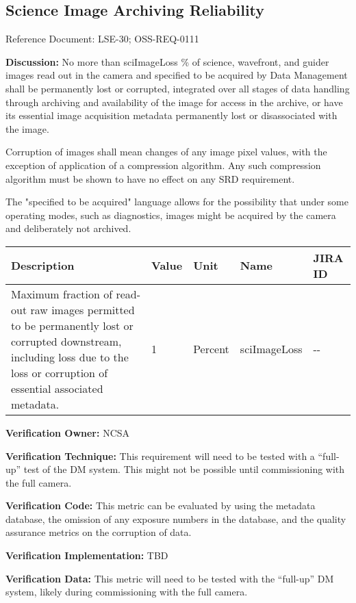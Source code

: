 \subsection{Science Image Archiving
Reliability}\label{science-image-archiving-reliability}

Reference Document: LSE-30; OSS-REQ-0111

\textbf{Discussion:} No more than sciImageLoss \% of science, wavefront,
and guider images read out in the camera and specified to be acquired by
Data Management shall be permanently lost or corrupted, integrated over
all stages of data handling through archiving and availability of the
image for access in the archive, or have its essential image acquisition
metadata permanently lost or disassociated with the image.

Corruption of images shall mean changes of any image pixel values, with
the exception of application of a compression algorithm. Any such
compression algorithm must be shown to have no effect on any SRD
requirement.

The "specified to be acquired" language allows for the possibility that
under some operating modes, such as diagnostics, images might be
acquired by the camera and deliberately not archived.

\begin{longtable}[]{@{}lllll@{}}
\toprule
Description & Value & Unit & Name & JIRA ID\tabularnewline
\midrule
\endhead
Maximum fraction of read-out raw images permitted to be permanently lost
or corrupted downstream, including loss due to the loss or corruption of
essential associated metadata. & 1 & Percent & sciImageLoss &
-\/-\tabularnewline
\bottomrule
\end{longtable}

\textbf{Verification Owner:} NCSA

\textbf{Verification Technique:} This requirement will need to be tested
with a ``full-up'' test of the DM system. This might not be possible
until commissioning with the full camera.

\textbf{Verification Code:} This metric can be evaluated by using the
metadata database, the omission of any exposure numbers in the database,
and the quality assurance metrics on the corruption of data.

\textbf{Verification Implementation:} TBD

\textbf{Verification Data:} This metric will need to be tested with the
``full-up'' DM system, likely during commissioning with the full camera.
